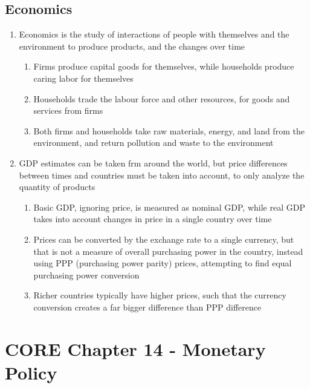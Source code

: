 \documentclass[11 pt, twoside]{article}
\begin{document}
\subsection{Economics}
\begin{enumerate}
\item Economics is the study of interactions of people with themselves and the environment to produce products, and the changes over time
\begin{enumerate}
\item Firms produce capital goods for themselves, while households produce caring labor for themselves
\item Households trade the labour force and other resources, for goods and services from firms
\item Both firms and households take raw materials, energy, and land from the environment, and return pollution and waste to the environment
\end{enumerate}
\item GDP estimates can be taken frm around the world, but price differences between times and countries must be taken into account, to only analyze the quantity of products
\begin{enumerate}
\item Basic GDP, ignoring price, is measured as nominal GDP, while real GDP takes into account changes in price in a single country over time
\item Prices can be converted by the exchange rate to a single currency, but that is not a measure of overall purchasing power in the country, instead using PPP (purchasing power parity) prices, attempting to find equal purchasing power conversion
\item Richer countries typically have higher prices, such that the currency conversion creates a far bigger difference than PPP difference
\end{enumerate}
\end{enumerate}

\section{CORE Chapter 14 - Monetary Policy}
\end{document}

